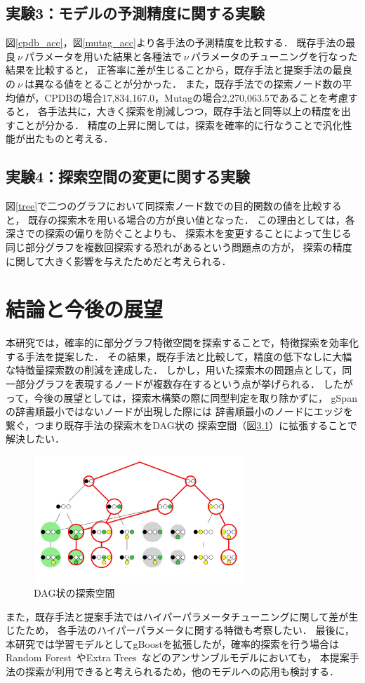 \section{実験3：モデルの予測精度に関する実験}
図\ref{cpdb_acc}，図\ref{mutag_acc}より各手法の予測精度を比較する．
既存手法の最良$\ \nu\ $パラメータを用いた結果と各種法で$\ \nu\ $パラメータのチューニングを行なった結果を比較すると，
正答率に差が生じることから，既存手法と提案手法の最良の$\ \nu\ $は異なる値をとることが分かった．
また，既存手法での探索ノード数の平均値が，CPDBの場合17,834,167.0，Mutagの場合2,270,063.5であることを考慮すると，
各手法共に，大きく探索を削減しつつ，既存手法と同等以上の精度を出すことが分かる．
精度の上昇に関しては，探索を確率的に行なうことで汎化性能が出たものと考える．

\section{実験4：探索空間の変更に関する実験}
図\ref{tree}で二つのグラフにおいて同探索ノード数での目的関数の値を比較すると，
既存の探索木を用いる場合の方が良い値となった．
この理由としては，各深さでの探索の偏りを防ぐことよりも、
探索木を変更することによって生じる同じ部分グラフを複数回探索する恐れがあるという問題点の方が，
探索の精度に関して大きく影響を与えたためだと考えられる．


\chapter{結論と今後の展望}
本研究では，確率的に部分グラフ特徴空間を探索することで，特徴探索を効率化する手法を提案した．
その結果，既存手法と比較して，精度の低下なしに大幅な特徴量探索数の削減を達成した．
しかし，用いた探索木の問題点として，同一部分グラフを表現するノードが複数存在するという点が挙げられる．
したがって，今後の展望としては，探索木構築の際に同型判定を取り除かずに，
gSpanの辞書順最小ではないノードが出現した際には
辞書順最小のノードにエッジを繋ぐ，つまり既存手法の探索木をDAG状の
探索空間（図\ref{DAG}）に拡張することで解決したい．
\begin{figure}[t]
	\centering
	\includegraphics[width=80mm]{figure/DAG.jpg}
	\caption{DAG状の探索空間}
	\label{DAG}
\end{figure}
また，既存手法と提案手法ではハイパーパラメータチューニングに関して差が生じたため，
各手法のハイパーパラメータに関する特徴も考察したい．
最後に，本研究では学習モデルとしてgBoostを拡張したが，確率的探索を行う場合は
Random Forest~\cite{RF}やExtra Trees~\cite{ET}などのアンサンブルモデルにおいても，
本提案手法の探索が利用できると考えられるため，他のモデルへの応用も検討する．

